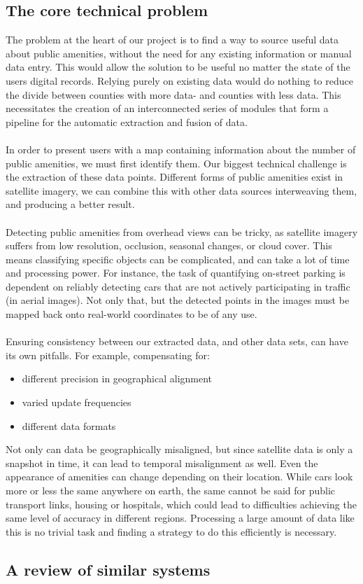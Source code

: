 \subsection{The core technical problem}
The problem at the heart of our project is to find a way to source useful data about public amenities, without the need for any existing information or manual data entry.
This would allow the solution to be useful no matter the state of the users digital records.
Relying purely on existing data would do nothing to reduce the divide between counties with more data- and counties with less data.
This necessitates the creation of an interconnected series of modules that form a pipeline for the automatic extraction and fusion of data.
\\ \\
In order to present users with a map containing information about the number of public amenities, we must first identify them.
Our biggest technical challenge is the extraction of these data points. Different forms of public amenities exist in satellite
imagery, we can combine this with other data sources interweaving them, and producing a better result.
\\ \\
Detecting public amenities from overhead views can be tricky, as satellite imagery suffers from low resolution,
occlusion, seasonal changes, or cloud cover. This means classifying specific objects can be complicated, and can take a lot of time
and processing power. For instance, the task of quantifying on-street parking is dependent on reliably detecting cars that are not
actively participating in traffic (in aerial images). Not only that, but the detected points in the images must be mapped
back onto real-world coordinates to be of any use.
\\ \\
Ensuring consistency between our extracted data, and other data sets, can have its own pitfalls.
For example, compensating for:
\begin{itemize}
  \item{different precision in geographical alignment}
  \item{varied update frequencies}
  \item{different data formats}
\end{itemize}
Not only can data be geographically misaligned, but since satellite data is only a snapshot in time, it can lead to
temporal misalignment as well. Even the appearance of amenities can change depending on their location.
While cars look more or less the same anywhere on earth, the same cannot be said for public transport links, housing or hospitals,
which could lead to difficulties achieving the same level of accuracy in different regions.
Processing a large amount of data like this is no trivial task and finding a strategy to do this efficiently is necessary.

\subsection{A review of similar systems}
